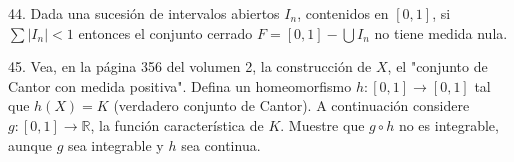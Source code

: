 \documentclass[12pt,oneside]{book}
\begin{document}
44. Dada una sucesión de intervalos abiertos \( I_n \), contenidos en \( [0, 1] \), si \( \sum |I_n| < 1 \) entonces el conjunto cerrado \( F = [0, 1] - \bigcup I_n \) no tiene medida nula.

45. Vea, en la página 356 del volumen 2, la construcción de \( X \), el "conjunto de Cantor con medida positiva". Defina un homeomorfismo \( h: [0, 1] \to [0, 1] \) tal que \( h(X) = K \) (verdadero conjunto de Cantor). A continuación considere \( g: [0, 1] \to \mathbb{R} \), la función característica de \( K \). Muestre que \( g \circ h \) no es integrable, aunque \( g \) sea integrable y \( h \) sea continua.

\newpage
\end{document}

